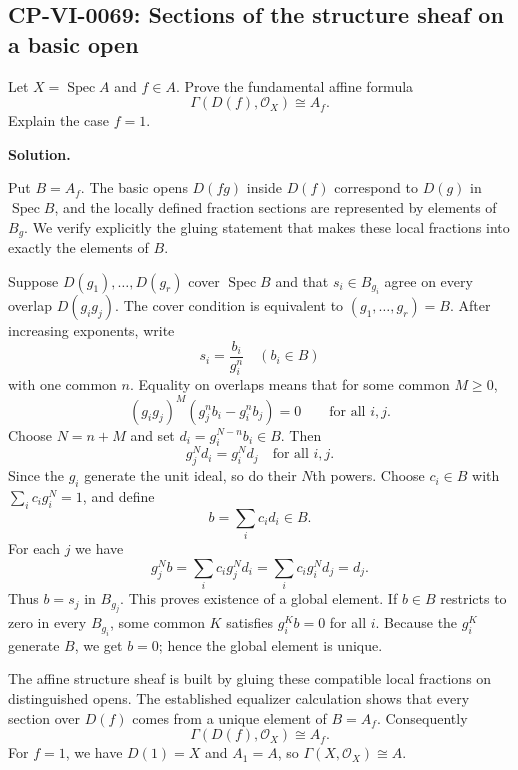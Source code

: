 
\subsection*{CP-VI-0069: Sections of the structure sheaf on a basic open}

Let $X=\operatorname{Spec}A$ and $f\in A$. Prove the fundamental affine formula
\[
\Gamma(D(f),\mathcal O_X)\cong A_f.
\]
Explain the case $f=1$.

\medskip
\noindent\textbf{Solution.}

Put $B=A_f$. The basic opens $D(fg)$ inside $D(f)$ correspond to
$D(g)$ in $\operatorname{Spec}B$, and the locally defined fraction sections
are represented by elements of $B_g$. We verify explicitly the gluing
statement that makes these local fractions into exactly the elements of $B$.

Suppose $D(g_1),\ldots,D(g_r)$ cover $\operatorname{Spec}B$ and that
$s_i\in B_{g_i}$ agree on every overlap $D(g_ig_j)$. The cover condition is
equivalent to $(g_1,\ldots,g_r)=B$. After increasing exponents, write
\[
s_i=\frac{b_i}{g_i^n}\quad(b_i\in B)
\]
with one common $n$. Equality on overlaps means that for some common
$M\geq0$,
\[
(g_ig_j)^M(g_j^n b_i-g_i^n b_j)=0
\qquad\text{for all }i,j.
\]
Choose $N=n+M$ and set $d_i=g_i^{N-n}b_i\in B$. Then
\[
g_j^N d_i=g_i^N d_j\quad\text{for all }i,j.
\]
Since the $g_i$ generate the unit ideal, so do their $N$th powers.
Choose $c_i\in B$ with $\sum_i c_i g_i^N=1$, and define
\[
b=\sum_i c_i d_i\in B.
\]
For each $j$ we have
\[
g_j^N b=\sum_i c_i g_j^N d_i
=\sum_i c_i g_i^N d_j=d_j.
\]
Thus $b=s_j$ in $B_{g_j}$. This proves existence of a global element.
If $b\in B$ restricts to zero in every $B_{g_i}$, some common $K$ satisfies
$g_i^K b=0$ for all $i$. Because the $g_i^K$ generate $B$, we get $b=0$;
hence the global element is unique.

The affine structure sheaf is built by gluing these compatible local
fractions on distinguished opens. The established equalizer calculation
shows that every section over $D(f)$ comes from a unique element of
$B=A_f$. Consequently
\[
\boxed{\Gamma(D(f),\mathcal O_X)\cong A_f.}
\]
For $f=1$, we have $D(1)=X$ and $A_1=A$, so
$\Gamma(X,\mathcal O_X)\cong A$.
